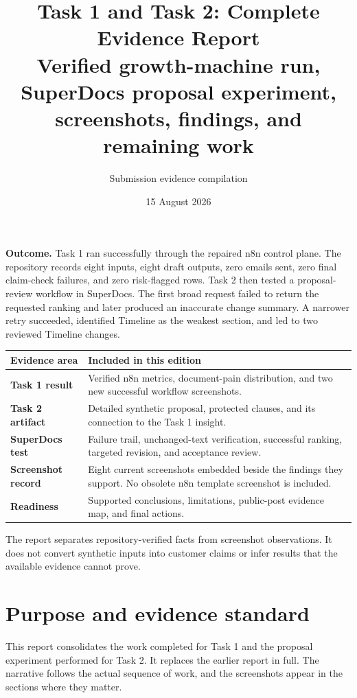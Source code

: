\documentclass[11pt,a4paper]{article}
\title{\vspace{-14mm}\textbf{Task 1 and Task 2: Complete Evidence Report}\\[5pt]\large Verified growth-machine run, SuperDocs proposal experiment, screenshots, findings, and remaining work}
\author{Submission evidence compilation}
\date{15 August 2026}
\newcommand{\evidencebox}[1]{\begin{center}\colorbox{Soft}{\parbox{0.92\textwidth}{#1}}\end{center}}
\begin{document}
\maketitle
\thispagestyle{empty}

\evidencebox{\textbf{Outcome.} Task 1 ran successfully through the repaired n8n control plane. The repository records eight inputs, eight draft outputs, zero emails sent, zero final claim-check failures, and zero risk-flagged rows. Task 2 then tested a proposal-review workflow in SuperDocs. The first broad request failed to return the requested ranking and later produced an inaccurate change summary. A narrower retry succeeded, identified Timeline as the weakest section, and led to two reviewed Timeline changes.}

\vfill
\begin{tabularx}{\textwidth}{>{\bfseries}p{} X}
\toprule
Evidence area & Included in this edition \\
\midrule
Task 1 result & Verified n8n metrics, document-pain distribution, and two new successful workflow screenshots. \\
Task 2 artifact & Detailed synthetic proposal, protected clauses, and its connection to the Task 1 insight. \\
SuperDocs test & Failure trail, unchanged-text verification, successful ranking, targeted revision, and acceptance review. \\
Screenshot record & Eight current screenshots embedded beside the findings they support. No obsolete n8n template screenshot is included. \\
Readiness & Supported conclusions, limitations, public-post evidence map, and final actions. \\
\bottomrule
\end{tabularx}

\vfill
\textcolor{Muted}{The report separates repository-verified facts from screenshot observations. It does not convert synthetic inputs into customer claims or infer results that the available evidence cannot prove.}

\newpage
\tableofcontents
\newpage

\section{Purpose and evidence standard}

This report consolidates the work completed for Task 1 and the proposal experiment performed for Task 2. It replaces the earlier report in full. The narrative follows the actual sequence of work, and the screenshots appear in the sections where they matter.
\end{document}
